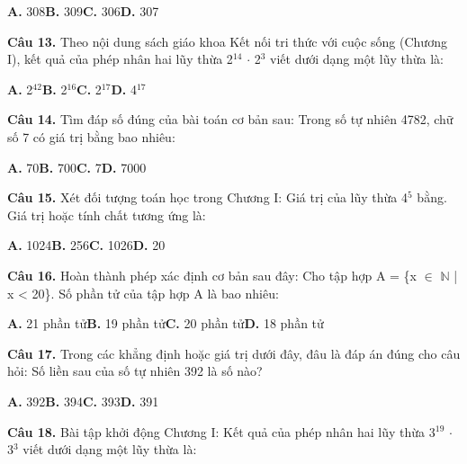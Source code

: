 \documentclass[11pt,a4paper]{article}
\begin{document}
\hspace*{1.5em}\textbf{A.} 308\quad\quad \textbf{B.} 309\quad\quad \textbf{C.} 306\quad\quad \textbf{D.} 307\par\vspace{2pt}
\textbf{\color{primary} Câu 13.} Theo nội dung sách giáo khoa Kết nối tri thức với cuộc sống (Chương I), kết quả của phép nhân hai lũy thừa 2$^{14}$ $\cdot$ 2$^{3}$ viết dưới dạng một lũy thừa là:\par
\hspace*{1.5em}\textbf{A.} 2$^{42}$\quad\quad \textbf{B.} 2$^{16}$\quad\quad \textbf{C.} 2$^{17}$\quad\quad \textbf{D.} 4$^{17}$\par\vspace{2pt}
\textbf{\color{primary} Câu 14.} Tìm đáp số đúng của bài toán cơ bản sau: Trong số tự nhiên 4782, chữ số 7 có giá trị bằng bao nhiêu:\par
\hspace*{1.5em}\textbf{A.} 70\quad\quad \textbf{B.} 700\quad\quad \textbf{C.} 7\quad\quad \textbf{D.} 7000\par\vspace{2pt}
\textbf{\color{primary} Câu 15.} Xét đối tượng toán học trong Chương I: Giá trị của lũy thừa 4$^{5}$ bằng. Giá trị hoặc tính chất tương ứng là:\par
\hspace*{1.5em}\textbf{A.} 1024\quad\quad \textbf{B.} 256\quad\quad \textbf{C.} 1026\quad\quad \textbf{D.} 20\par\vspace{2pt}
\textbf{\color{primary} Câu 16.} Hoàn thành phép xác định cơ bản sau đây: Cho tập hợp A = \{x $\in$ $\mathbb{N}$ | x < 20\}. Số phần tử của tập hợp A là bao nhiêu:\par
\hspace*{1.5em}\textbf{A.} 21 phần tử\quad\quad \textbf{B.} 19 phần tử\quad\quad \textbf{C.} 20 phần tử\quad\quad \textbf{D.} 18 phần tử\par\vspace{2pt}
\textbf{\color{primary} Câu 17.} Trong các khẳng định hoặc giá trị dưới đây, đâu là đáp án đúng cho câu hỏi: Số liền sau của số tự nhiên 392 là số nào?\par
\hspace*{1.5em}\textbf{A.} 392\quad\quad \textbf{B.} 394\quad\quad \textbf{C.} 393\quad\quad \textbf{D.} 391\par\vspace{2pt}
\textbf{\color{primary} Câu 18.} Bài tập khởi động Chương I: Kết quả của phép nhân hai lũy thừa 3$^{19}$ $\cdot$ 3$^{3}$ viết dưới dạng một lũy thừa là:\par
\end{document}
